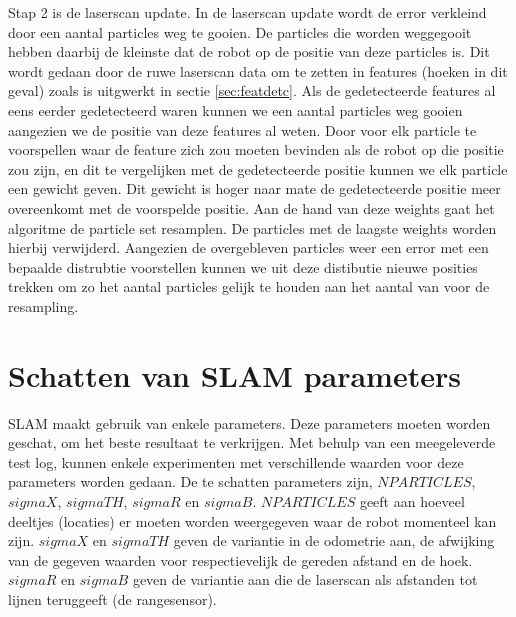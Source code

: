 \documentclass[a4paper]{article}
\begin{document}
Stap 2 is de laserscan update. In de laserscan update wordt de error verkleind door een aantal particles weg te gooien. De particles die worden weggegooit hebben daarbij de kleinste dat de robot op de positie van deze particles is. Dit wordt gedaan door de ruwe laserscan data om te zetten in features (hoeken in dit geval) zoals is uitgwerkt in sectie \ref{sec:featdetc}. Als de gedetecteerde features al eens eerder gedetecteerd waren kunnen we een aantal particles weg gooien aangezien we de positie van deze features al weten. Door voor elk particle te voorspellen waar de feature zich zou moeten bevinden als de robot op die positie zou zijn, en dit te vergelijken met de gedetecteerde positie kunnen we elk particle een gewicht geven. Dit gewicht is hoger naar mate de gedetecteerde positie meer overeenkomt met de voorspelde positie. Aan de hand van deze weights gaat het algoritme de particle set resamplen. De particles met de laagste weights worden hierbij verwijderd. Aangezien de overgebleven particles weer een error met een bepaalde distrubtie voorstellen kunnen we uit deze distibutie nieuwe posities trekken om zo het aantal particles gelijk te houden aan het aantal van voor de resampling.

\section{Schatten van SLAM parameters}
SLAM maakt gebruik van enkele parameters. Deze parameters moeten worden geschat, om het beste resultaat te verkrijgen. Met behulp van een meegeleverde test log, kunnen enkele experimenten met verschillende waarden voor deze parameters worden gedaan. De te schatten parameters zijn, $NPARTICLES$, $sigmaX$, $sigmaTH$, $sigmaR$ en $sigmaB$. $NPARTICLES$ geeft aan hoeveel deeltjes (locaties) er moeten worden weergegeven waar de robot momenteel kan zijn. $sigmaX$ en $sigmaTH$ geven de variantie in de odometrie aan, de afwijking van de gegeven waarden voor respectievelijk de gereden afstand en de hoek. $sigmaR$ en $sigmaB$ geven de variantie aan die de laserscan als afstanden tot lijnen teruggeeft (de rangesensor).
\end{document}
